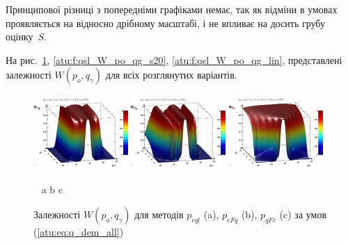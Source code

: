 Принципової різниці з попередніми графіками немає, так як відміни в
умовах проявляється на відносно дрібному масштабі, і не впливає
на досить грубу оцінку~$S$.

На рис.~\ref{atu:f:qsl_W_po_qg_all}, \ref{atu:f:qsl_W_po_qg_s20}, \ref{atu:f:qsl_W_po_qg_lin},
представлені залежності
$ W (p_o, q_\gamma) $ для всіх розглянутих варіантів.

\begin{figure}[htb!]
  \begin{center}
    \includegraphics[width=0.32\textwidth]{p/qls_pe-p_po_qg_Wql_all.png}
    \hfill
    \includegraphics[width=0.32\textwidth]{p/qls_pe-p_po_qg_WFq_all.png}
    \hfill
    \includegraphics[width=0.32\textwidth]{p/qls_pe-p_po_qg_WFc_all.png}
  \end{center}
  \vspace{-1.0ex}
  \begin{center}
    ~ \hfill a \hfill\hfill b \hfill\hfill c \hfill ~
  \end{center}
  \vspace{-2.0ex}
  \caption{Залежності $W(p_o,q_\gamma)$ для методів $p_{eql}$ (a), $p_{eFq}$ (b), $p_{qFc}$ (c) за умов (\ref{atu:eq:q_dem_all})}
  \label{atu:f:qsl_W_po_qg_all}
\end{figure}


